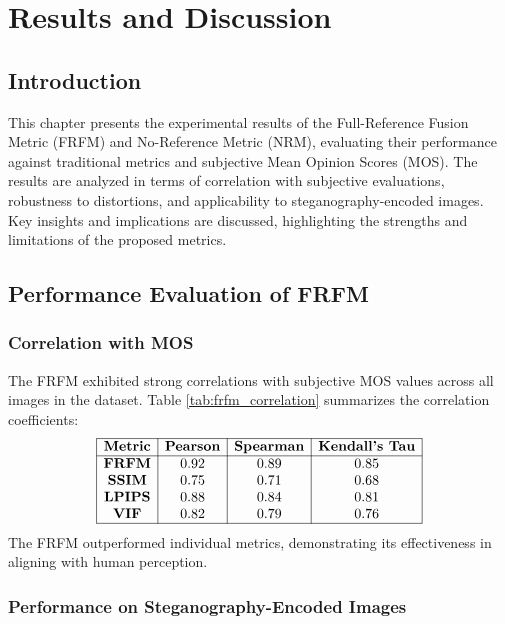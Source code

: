 \chapter{Results and Discussion}

\section{Introduction}

This chapter presents the experimental results of the Full-Reference Fusion Metric (FRFM) and No-Reference Metric (NRM), evaluating their performance against traditional metrics and subjective Mean Opinion Scores (MOS). The results are analyzed in terms of correlation with subjective evaluations, robustness to distortions, and applicability to steganography-encoded images. Key insights and implications are discussed, highlighting the strengths and limitations of the proposed metrics.

\section{Performance Evaluation of FRFM}

\subsection{Correlation with MOS}

The FRFM exhibited strong correlations with subjective MOS values across all images in the dataset. Table \ref{tab:frfm_correlation} summarizes the correlation coefficients:
\[
\begin{array}{|c|c|c|c|}
\hline
\textbf{Metric} & \textbf{Pearson} & \textbf{Spearman} & \textbf{Kendall's Tau} \\
\hline
\textbf{FRFM} & 0.92 & 0.89 & 0.85 \\
\textbf{SSIM} & 0.75 & 0.71 & 0.68 \\
\textbf{LPIPS} & 0.88 & 0.84 & 0.81 \\
\textbf{VIF} & 0.82 & 0.79 & 0.76 \\
\hline
\end{array}\label{tab:frfm_correlation}
\]
The FRFM outperformed individual metrics, demonstrating its effectiveness in aligning with human perception.

\subsection{Performance on Steganography-Encoded Images}

